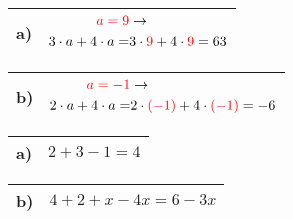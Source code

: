 \documentclass[12pt]{article}
\begin{document}
\vspace{0.5cm}
\begin{tabularx}{\textwidth}{|C{1.0cm}|X|}
\hline
a)&{$\begin{aligned}
\textcolor{red}{a=9} & \rightarrow\\
3 \cdot a + 4 \cdot a=&3 \cdot \textcolor{red}{9} + 4 \cdot \textcolor{red}{9}=63\\
\end{aligned}$}
\\\hline
\end{tabularx}
\vspace{0.5cm}
\begin{tabularx}{\textwidth}{|C{1.0cm}|X|}
\hline
b)&{$\begin{aligned}
\textcolor{red}{a=-1} & \rightarrow\\
2 \cdot a + 4 \cdot a=&2 \cdot \textcolor{red}{(-1)} + 4 \cdot \textcolor{red}{(-1)}=-6\\
\end{aligned}$}
\\\hline
\end{tabularx}
\vspace{0.5cm}
\begin{tabularx}{\textwidth}{|C{1.0cm}|X|}
\hline
a)&{$2 + 3 - 1=4$}
\\\hline
\end{tabularx}
\vspace{0.5cm}
\begin{tabularx}{\textwidth}{|C{1.0cm}|X|}
\hline
b)&{$4 + 2 + x - 4x=6 - 3x$}
\\\hline
\end{tabularx}
\vspace{0.5cm}
\end{document}
